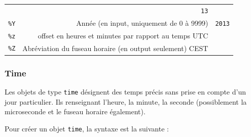 \documentclass[12pt,]{book}
\numberwithin{equation}{section}
\numberwithin{countremarque}{section}
\begin{document}
\begin{longtable}[]{@{}rrr@{}}
\begin{minipage}[t]{0.60\columnwidth}
\end{minipage} & \begin{minipage}[t]{0.22\columnwidth}\raggedleft\strut
\texttt{13}\strut
\end{minipage}\tabularnewline
\begin{minipage}[t]{0.10\columnwidth}\raggedleft\strut
\texttt{\%Y}\strut
\end{minipage} & \begin{minipage}[t]{0.60\columnwidth}\raggedleft\strut
Année (en input, uniquement de 0 à 9999)\strut
\end{minipage} & \begin{minipage}[t]{0.22\columnwidth}\raggedleft\strut
\texttt{2013}\strut
\end{minipage}\tabularnewline
\begin{minipage}[t]{0.10\columnwidth}\raggedleft\strut
\texttt{\%z}\strut
\end{minipage} & \begin{minipage}[t]{0.60\columnwidth}\raggedleft\strut
offset en heures et minutes par rapport au temps UTC\strut
\end{minipage} & \begin{minipage}[t]{0.22\columnwidth}\raggedleft\strut
\strut
\end{minipage}\tabularnewline
\begin{minipage}[t]{0.10\columnwidth}\raggedleft\strut
\texttt{\%Z}\strut
\end{minipage} & \begin{minipage}[t]{0.60\columnwidth}\raggedleft\strut
Abréviation du fuseau horaire (en output seulement) CEST\strut
\end{minipage} & \begin{minipage}[t]{0.22\columnwidth}\raggedleft\strut
\strut
\end{minipage}\tabularnewline
\bottomrule
\end{longtable}

\subsubsection{Time}\label{type-time}

Les objets de type \texttt{time} désignent des temps précis sans prise
en compte d'un jour particulier. Ils renseignant l'heure, la minute, la
seconde (possiblement la microseconde et le fuseau horaire également).

Pour créer un objet \texttt{time}, la syntaxe est la suivante :
\end{document}

